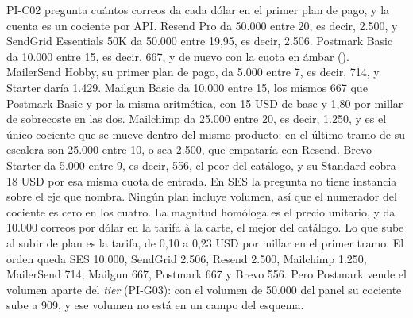 PI-C02 pregunta cuántos correos da cada dólar en el primer plan de pago, y la cuenta es
un cociente por API. Resend Pro da 50.000 entre 20, es decir, 2.500, y SendGrid
Essentials 50K da 50.000 entre 19,95, es decir, 2.506. Postmark Basic da 10.000 entre
15, es decir, 667, y de nuevo con la cuota en ámbar (\semambar{}).
MailerSend Hobby, su primer plan de pago, da 5.000 entre 7, es decir, 714, y Starter
daría 1.429.
Mailgun Basic da 10.000 entre 15, los mismos 667 que Postmark Basic y por la misma
aritmética, con 15 USD de base y 1,80 por millar de sobrecoste en las dos.
Mailchimp da 25.000 entre 20, es decir, 1.250, y es el único cociente que se mueve
dentro del mismo producto: en el último tramo de su escalera son 25.000 entre 10, o sea
2.500, que empataría con Resend.
Brevo Starter da 5.000 entre 9, es decir, 556, el peor del catálogo, y su Standard cobra
18 USD por esa misma cuota de entrada.
En SES la pregunta no tiene instancia sobre el eje que nombra. Ningún plan incluye
volumen, así que el numerador del cociente es cero en los cuatro. La magnitud homóloga
es el precio unitario, y da 10.000 correos por dólar en la tarifa à la carte, el mejor
del catálogo. Lo que sube al subir de plan es la tarifa, de 0,10 a 0,23 USD por millar
en el primer tramo.
El orden queda SES 10.000, SendGrid 2.506, Resend 2.500, Mailchimp 1.250, MailerSend
714, Mailgun 667, Postmark 667 y Brevo 556. Pero Postmark vende el volumen aparte del
\textit{tier} (PI-G03): con el volumen de 50.000 del panel su cociente sube a 909, y ese
volumen no está en un campo del esquema.

